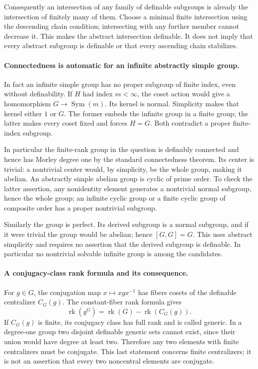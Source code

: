 \documentclass[11pt]{article}
\begin{document}
Consequently an intersection of any family of definable subgroups is
already the intersection of finitely many of them. Choose a minimal
finite intersection using the descending chain condition; intersecting
with any further member cannot decrease it. This makes the abstract
intersection definable. It does not imply that every abstract subgroup
is definable or that every ascending chain stabilizes.

\paragraph{Connectedness is automatic for an infinite abstractly simple group.}
In fact an infinite simple group has no proper subgroup of finite index,
even without definability. If $H$ had index $m<\infty$, the coset
action would give a homomorphism $G\to\operatorname{Sym}(m)$.
Its kernel is normal. Simplicity makes that kernel either $1$ or $G$.
The former embeds the infinite group in a finite group; the latter
makes every coset fixed and forces $H=G$. Both contradict a proper
finite-index subgroup.

In particular the finite-rank group in the question is definably
connected and hence has Morley degree one by the standard connectedness
theorem. Its center is trivial: a nontrivial center would, by simplicity,
be the whole group, making it abelian. An abstractly simple abelian
group is cyclic of prime order. To check the latter assertion, any
nonidentity element generates a nontrivial normal subgroup, hence the
whole group; an infinite cyclic group or a finite cyclic group of
composite order has a proper nontrivial subgroup.

Similarly the group is perfect. Its derived subgroup is a normal
subgroup, and if it were trivial the group would be abelian; hence
$[G,G]=G$. This uses abstract simplicity and requires no assertion that
the derived subgroup is definable. In particular no nontrivial solvable
infinite group is among the candidates.

\paragraph{A conjugacy-class rank formula and its consequence.}
For $g\in G$, the conjugation map $x\mapsto xgx^{-1}$ has fibers
cosets of the definable centralizer $C_G(g)$. The constant-fiber rank
formula gives
\[
 \operatorname{rk}(g^G)=\operatorname{rk}(G)
                          -\operatorname{rk}(C_G(g)).
 \tag{382.3}
\]
If $C_G(g)$ is finite, its conjugacy class has full rank and is called
generic. In a degree-one group two disjoint definable generic sets
cannot exist, since their union would have degree at least two.
Therefore any two elements with finite centralizers must be conjugate.
This last statement concerns finite centralizers; it is not an assertion
that every two noncentral elements are conjugate.
\end{document}
